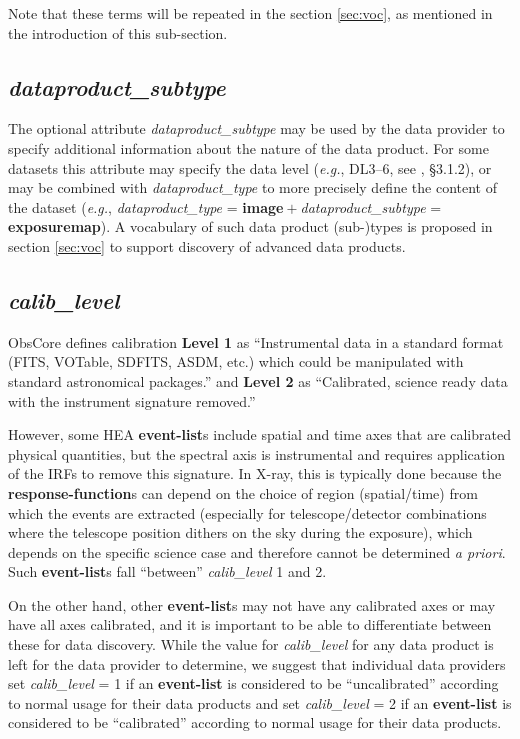 \documentclass[11pt,a4paper]{ivoa}
\begin{document}
Note that these terms will be repeated in the section \ref{sec:voc}, as mentioned in the introduction of this sub-section.

\subsection{{\em dataproduct\_subtype}}

The optional attribute {\em dataproduct\_subtype} may be used by the data provider to specify additional information about the nature of the data product. For some datasets this attribute may specify the data level ({\em e.g.\/}, DL3--6, see \citealt{2024ivoa.note.heig}, \S3.1.2), or may be combined with {\em dataproduct\_type\/} to more precisely define the content of the dataset ({\em e.g.\/}, {\em dataproduct\_type\/} = {\bf image}${}+{}${\em dataproduct\_subtype\/} = {\bf exposuremap}). A vocabulary of such data product (sub-)types is proposed in section \ref{sec:voc} to support discovery of advanced data products.


\subsection{{\em calib\_level}}

ObsCore defines calibration {\bf Level 1} as ``Instrumental data in a standard format (FITS, VOTable, SDFITS, ASDM, etc.) which could be manipulated with standard astronomical packages.'' and {\bf Level 2} as ``Calibrated, science ready data with the instrument signature removed.''

However, some \gls{HEA} {\bf event-list}s include spatial and time axes that are calibrated physical quantities, but the spectral axis is instrumental and requires application of the IRFs to remove this signature. In X-ray, this is typically done because the {\bf response-function}s can depend on the choice of region (spatial/time) from which the events are extracted (especially for telescope/detector combinations where the telescope position dithers on the sky during the exposure), which depends on the specific science case and therefore cannot be determined {\em a priori\/}.  Such {\bf event-list}s fall ``between'' {\em calib\_level\/} 1 and 2.

On the other hand, other {\bf event-list}s may not have any calibrated axes or may have all axes calibrated, and it is important to be able to differentiate between these for data discovery.  While the value for {\em calib\_level\/} for any data product is left for the data provider to determine, we suggest that individual data providers set {\em calib\_level\/} = 1 if an {\bf event-list} is considered to be ``uncalibrated'' according to normal usage for their data products and set {\em calib\_level\/} = 2 if an {\bf event-list} is considered to be ``calibrated'' according to normal usage for their data products.
\end{document}
